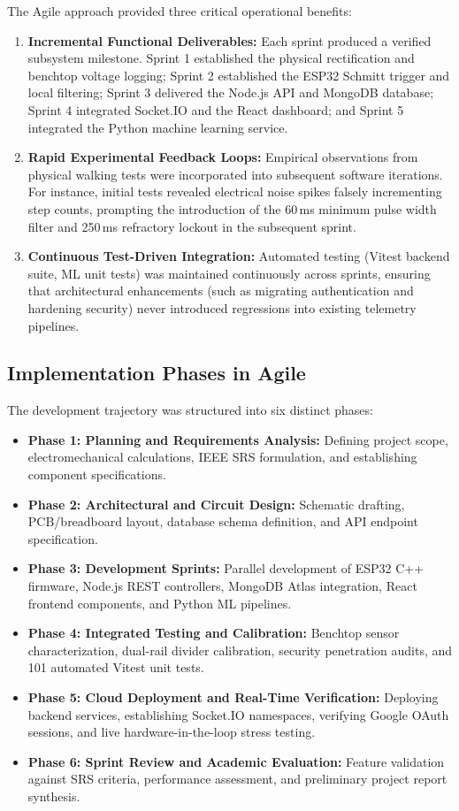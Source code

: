 The Agile approach provided three critical operational benefits:
\begin{enumerate}
    \item \textbf{Incremental Functional Deliverables:} Each sprint produced a verified subsystem milestone. Sprint 1 established the physical rectification and benchtop voltage logging; Sprint 2 established the ESP32 Schmitt trigger and local filtering; Sprint 3 delivered the Node.js API and MongoDB database; Sprint 4 integrated Socket.IO and the React dashboard; and Sprint 5 integrated the Python machine learning service.
    \item \textbf{Rapid Experimental Feedback Loops:} Empirical observations from physical walking tests were incorporated into subsequent software iterations. For instance, initial tests revealed electrical noise spikes falsely incrementing step counts, prompting the introduction of the 60\,ms minimum pulse width filter and 250\,ms refractory lockout in the subsequent sprint.
    \item \textbf{Continuous Test-Driven Integration:} Automated testing (Vitest backend suite, ML unit tests) was maintained continuously across sprints, ensuring that architectural enhancements (such as migrating authentication and hardening security) never introduced regressions into existing telemetry pipelines.
\end{enumerate}

\subsection{Implementation Phases in Agile}
The development trajectory was structured into six distinct phases:
\begin{itemize}
    \item \textbf{Phase 1: Planning and Requirements Analysis:} Defining project scope, electromechanical calculations, IEEE SRS formulation, and establishing component specifications.
    \item \textbf{Phase 2: Architectural and Circuit Design:} Schematic drafting, PCB/breadboard layout, database schema definition, and API endpoint specification.
    \item \textbf{Phase 3: Development Sprints:} Parallel development of ESP32 C++ firmware, Node.js REST controllers, MongoDB Atlas integration, React frontend components, and Python ML pipelines.
    \item \textbf{Phase 4: Integrated Testing and Calibration:} Benchtop sensor characterization, dual-rail divider calibration, security penetration audits, and 101 automated Vitest unit tests.
    \item \textbf{Phase 5: Cloud Deployment and Real-Time Verification:} Deploying backend services, establishing Socket.IO namespaces, verifying Google OAuth sessions, and live hardware-in-the-loop stress testing.
    \item \textbf{Phase 6: Sprint Review and Academic Evaluation:} Feature validation against SRS criteria, performance assessment, and preliminary project report synthesis.
\end{itemize}
